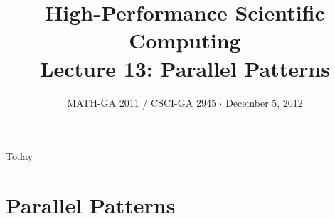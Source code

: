 \documentclass[english,compress]{beamer}
\begin{document}

\title{High-Performance Scientific Computing\\Lecture 13: Parallel
Patterns}

\date{MATH-GA 2011 / CSCI-GA 2945 $\cdot$ December 5, 2012}

\frame{\titlepage}

\begin{frame}{Today}
  \tableofcontents[hideallsubsections]
\end{frame}
\begin{comment}
\begin{frame}{Bits and pieces}
  \begin{itemize}
    \item Don't have a project? Let's fix that \emph{very soon}
    \item HW5: soon
    \item HW6: due today
    \item Dec 5: Last day of regular class
    \item Dec 12: Legislative Day
    \item Dec 17/18/\textbf{19}: Project presentations
    \item Don't have grade reports for HW1\dots4? Talk to me
  \end{itemize}
\end{frame}
\end{comment}

\section{Parallel Patterns}
\end{document}
